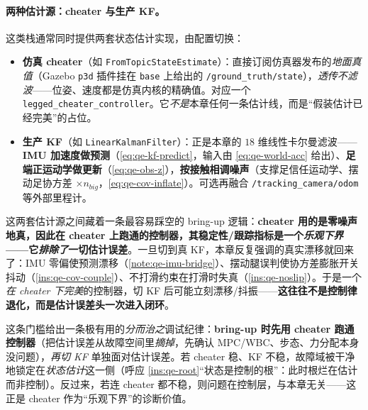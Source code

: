 \paragraph{两种估计源：cheater 与生产 KF。}
这类栈通常同时提供两套状态估计实现，由配置切换：
\begin{itemize}
  \item \textbf{仿真 cheater}（如 \texttt{FromTopicStateEstimate}）：直接订阅仿真器发布的\emph{地面真值}（Gazebo \texttt{p3d} 插件挂在 \texttt{base} 上给出的 \texttt{/\allowbreak ground\_truth/\allowbreak state}），\emph{透传不滤波}——位姿、速度都是仿真内核的精确值。对应一个 \texttt{legged\_cheater\_controller}。它\emph{不是}本章任何一条估计线，而是“假装估计已经完美”的占位。
  \item \textbf{生产 KF}（如 \texttt{LinearKalmanFilter}）：正是本章的 $18$ 维线性卡尔曼滤波——\textbf{IMU 加速度做预测}（\cref{eq:qe-kf-predict}，输入由 \cref{eq:qe-world-acc} 给出）、\textbf{足端正运动学做更新}（\cref{eq:qe-obs-z}），\textbf{按接触相调噪声}（支撑足信任运动学、摆动足协方差 $\times n_{big}$，\cref{eq:qe-cov-inflate}）。可选再融合 \texttt{/\allowbreak tracking\_camera/\allowbreak odom} 等外部里程计。
\end{itemize}

\begin{insight}\label{ins:qe-cheater-gate}
这两套估计源之间藏着一条最容易踩空的 bring-up 逻辑：\textbf{cheater 用的是零噪声地真，因此在 cheater 上跑通的控制器，其稳定性/跟踪指标是一个\emph{乐观下界}——它\emph{排除了}一切估计误差}。一旦切到真 KF，本章反复强调的真实漂移就回来了：IMU 零偏使预测漂移（\cref{note:qe-imu-bridge}）、摆动腿误判使协方差膨胀开关抖动（\cref{ins:qe-cov-couple}）、不打滑约束在打滑时失真（\cref{ins:qe-noslip}）。于是一个\emph{在 cheater 下完美}的控制器，切 KF 后可能立刻漂移/抖振——\textbf{这往往不是控制律退化，而是估计误差头一次进入闭环}。

这条门槛给出一条极有用的\emph{分而治之}调试纪律：\textbf{bring-up 时先用 cheater 跑通控制器}（把估计误差从故障空间里\emph{摘掉}，先确认 MPC/WBC、步态、力分配本身没问题），\emph{再切 KF} 单独面对估计误差。若 cheater 稳、KF 不稳，故障域被干净地锁定在\emph{状态估计}这一侧（呼应 \cref{ins:qe-root}“状态是控制的根”：此时根烂在估计而非控制）。反过来，若连 cheater 都不稳，则问题在控制层，与本章无关——这正是 cheater 作为“乐观下界”的诊断价值。
\end{insight}


